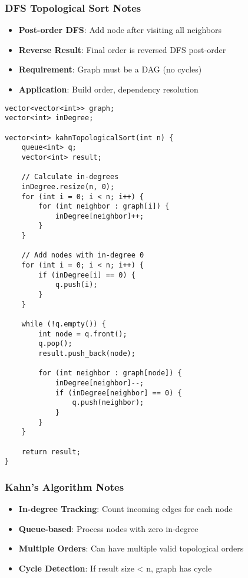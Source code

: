 \documentclass[11pt,a4paper]{article}
\begin{document}
\subsubsection{DFS Topological Sort Notes}
\begin{itemize}
\item \textbf{Post-order DFS}: Add node after visiting all neighbors
\item \textbf{Reverse Result}: Final order is reversed DFS post-order
\item \textbf{Requirement}: Graph must be a DAG (no cycles)
\item \textbf{Application}: Build order, dependency resolution
\end{itemize}

\newpage
\begin{lstlisting}[caption={Topological Sort with Kahn's Algorithm}]
vector<vector<int>> graph;
vector<int> inDegree;

vector<int> kahnTopologicalSort(int n) {
    queue<int> q;
    vector<int> result;
    
    // Calculate in-degrees
    inDegree.resize(n, 0);
    for (int i = 0; i < n; i++) {
        for (int neighbor : graph[i]) {
            inDegree[neighbor]++;
        }
    }
    
    // Add nodes with in-degree 0
    for (int i = 0; i < n; i++) {
        if (inDegree[i] == 0) {
            q.push(i);
        }
    }
    
    while (!q.empty()) {
        int node = q.front();
        q.pop();
        result.push_back(node);
        
        for (int neighbor : graph[node]) {
            inDegree[neighbor]--;
            if (inDegree[neighbor] == 0) {
                q.push(neighbor);
            }
        }
    }
    
    return result;
}
\end{lstlisting}

\subsubsection{Kahn's Algorithm Notes}
\begin{itemize}
\item \textbf{In-degree Tracking}: Count incoming edges for each node
\item \textbf{Queue-based}: Process nodes with zero in-degree
\item \textbf{Multiple Orders}: Can have multiple valid topological orders
\item \textbf{Cycle Detection}: If result size < n, graph has cycle
\end{itemize}
\end{document}
